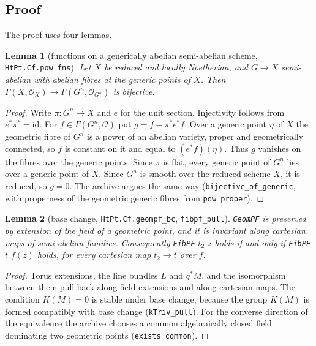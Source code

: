 \documentclass[11pt]{article}
\newcommand{\lean}[1]{\nolinkurl{#1}}
\newtheorem{lemma}{Lemma}[proposition]
\theoremstyle{remark}
\begin{document}
\subsection{Proof}

The proof uses four lemmas.

\begin{lemma}[functions on a generically abelian semi-abelian scheme, \lean{HtPt.Cf.pow_fns}]\label{lem:A1}
Let $X$ be reduced and locally Noetherian, and $G\to X$ semi-abelian with abelian fibres at the generic points of $X$. Then $\Gamma(X,\mathcal O_X)\to\Gamma(G^n,\mathcal O_{G^n})$ is bijective.
\end{lemma}
\begin{proof}
Write $\pi\colon G^n\to X$ and $e$ for the unit section. Injectivity follows from $e^*\pi^*=\mathrm{id}$. For $f\in\Gamma(G^n,\mathcal O)$ put $g=f-\pi^*e^*f$. Over a generic point $\eta$ of $X$ the geometric fibre of $G^n$ is a power of an abelian variety, proper and geometrically connected, so $f$ is constant on it and equal to $(e^*f)(\eta)$. Thus $g$ vanishes on the fibres over the generic points. Since $\pi$ is flat, every generic point of $G^n$ lies over a generic point of $X$. Since $G^n$ is smooth over the reduced scheme $X$, it is reduced, so $g=0$. The archive argues the same way (\lean{bijective_of_generic}, with properness of the geometric generic fibres from \lean{pow_proper}).
\end{proof}

\begin{lemma}[base change, \lean{HtPt.Cf.geompf_bc}, \lean{fibpf_pull}]\label{lem:A2}
\lean{GeomPF} is preserved by extension of the field of a geometric point, and it is invariant along cartesian maps of semi-abelian families. Consequently \lean{FibPF} $t_2$ $z$ holds if and only if \lean{FibPF} $t$ $f(z)$ holds, for every cartesian map $t_2\to t$ over $f$.
\end{lemma}
\begin{proof}
Torus extensions, the line bundles $L$ and $q^*M$, and the isomorphism between them pull back along field extensions and along cartesian maps. The condition $K(M)=0$ is stable under base change, because the group $K(M)$ is formed compatibly with base change (\lean{kTriv_pull}). For the converse direction of the equivalence the archive chooses a common algebraically closed field dominating two geometric points (\lean{exists_common}).
\end{proof}
\end{document}
